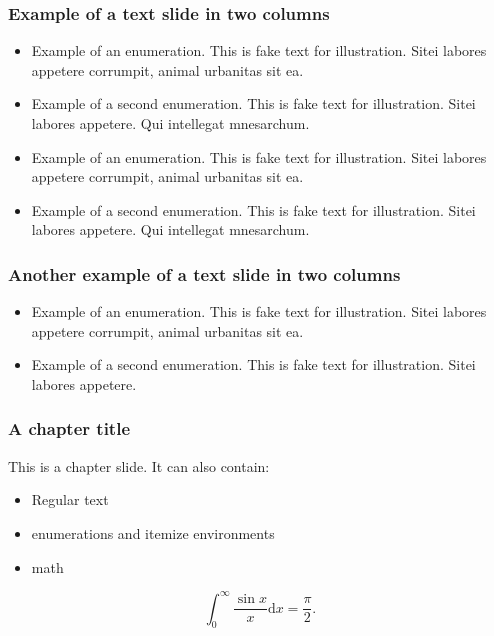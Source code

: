 \documentclass[t,aspectratio=169]{beamer}
\begin{document}

\title{} %
\begin{frame}
  \frametitle{Example of a text slide in two columns}
  
  \begin{multicols}{2}
    \begin{itemize}
      \item Example of an enumeration. This is fake text for illustration. Sitei labores appetere corrumpit, animal urbanitas sit ea.
      \item Example of a second enumeration. This is fake text for illustration. Sitei labores appetere. Qui intellegat mnesarchum.
      \item Example of an enumeration. This is fake text for illustration. Sitei labores appetere corrumpit, animal urbanitas sit ea.
      \item Example of a second enumeration. This is fake text for illustration. Sitei labores appetere. Qui intellegat mnesarchum.
    \end{itemize}
  \end{multicols}
\end{frame}

\begin{imageframe}[bgimage=rightpic.jpg]
  \twocolumn  %
  \frametitle{Another example of a text slide in two columns}
  
  \begin{itemize}
    \item Example of an enumeration. This is fake text for illustration. Sitei labores appetere corrumpit, animal urbanitas sit ea.
    \item Example of a second enumeration. This is fake text for illustration. Sitei labores appetere.
          \newpage  %
  \end{itemize}
  
\end{imageframe}
\onecolumn %

\begin{chapterframe}
  \frametitle{A chapter title}
  
  This is a chapter slide. It can also contain:
  \begin{itemize}
    \item Regular text
    \item enumerations and itemize environments
    \item math
  \end{itemize}
  \[
    \int_0^\infty \frac{\sin x}{x} \text{d}x=\frac{\pi}{2}.
  \]
\end{chapterframe}
\end{document}
